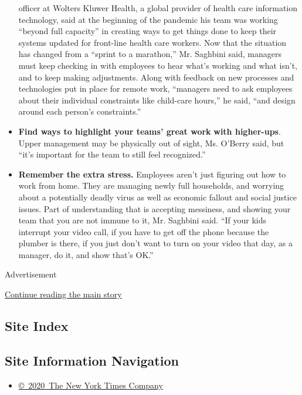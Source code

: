 \begin{itemize}
  officer at Wolters Kluwer Health, a global provider of health care
  information technology, said at the beginning of the pandemic his team
  was working ``beyond full capacity'' in creating ways to get things
  done to keep their systems updated for front-line health care workers.
  Now that the situation has changed from a ``sprint to a marathon,''
  Mr. Saghbini said, managers must keep checking in with employees to
  hear what's working and what isn't, and to keep making adjustments.
  Along with feedback on new processes and technologies put in place for
  remote work, ``managers need to ask employees about their individual
  constraints like child-care hours,'' he said, ``and design around each
  person's constraints.''
\item
  \textbf{Find ways to highlight your teams' great work} \textbf{with
  higher-ups}. Upper management may be physically out of sight, Ms.
  O'Berry said, but ``it's important for the team to still feel
  recognized.''
\item
  \textbf{Remember the extra stress.} Employees aren't just figuring out
  how to work from home. They are managing newly full households, and
  worrying about a potentially deadly virus as well as economic fallout
  and social justice issues. Part of understanding that is accepting
  messiness, and showing your team that you are not immune to it, Mr.
  Saghbini said. ``If your kids interrupt your video call, if you have
  to get off the phone because the plumber is there, if you just don't
  want to turn on your video that day, as a manager, do it, and show
  that's OK.''
\end{itemize}

Advertisement

\protect\hyperlink{after-bottom}{Continue reading the main story}

\hypertarget{site-index}{%
\subsection{Site Index}\label{site-index}}

\hypertarget{site-information-navigation}{%
\subsection{Site Information
Navigation}\label{site-information-navigation}}

\begin{itemize}
\tightlist
\item
  \href{https://help.nytimes.com/hc/en-us/articles/115014792127-Copyright-notice}{©~2020~The
  New York Times Company}
\end{itemize}

